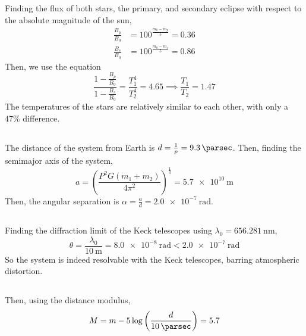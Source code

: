 \documentclass{article}
\begin{document}
\subsection{}

Finding the flux of both stars, the primary, and secondary eclipse with respect to the absolute magnitude of the sun,
\begin{align}
    \frac{B_p}{B_0} &= 100^{\frac{m_0 - m_p}{5}} = \num{0.36} \\
    \frac{B_s}{B_0} &= 100^{\frac{m_0 - m_s}{5}} = \num{0.86}
\end{align}
Then, we use the equation
\begin{equation}
    \frac{1 - \frac{B_p}{B_0}}{1 - \frac{B_s}{B_0}} = \frac{T_1^4}{T_2^4} = \num{4.65} \implies \frac{T_1}{T_2} = \num{1.47}
\end{equation}
The temperatures of the stars are relatively similar to each other, with only a \(47\%\) difference.

\subsection{}

The distance of the system from Earth is \(d = \frac{1}{p} = \SI{9.3}{\parsec}\).
Then, finding the semimajor axis of the system,
\begin{equation}
    a = \left(\frac{P^2 G (m_1 + m_2)}{4 \pi^2}\right)^{\frac{1}{3}} = \SI{5.7e+10}{\meter}
\end{equation}
Then, the angular separation is \(\alpha = \frac{a}{d} = \SI{2.0e-7}{\radian}\).

\subsection{}

Finding the diffraction limit of the Keck telescopes using \(\lambda_0 = \SI{656.281}{\nano\meter}\),
\begin{equation}
    \theta = \frac{\lambda_0}{\SI{10}{\meter}} = \SI{8.0e-8}{\radian} < \SI{2.0e-7}{\radian}
\end{equation}
So the system is indeed resolvable with the Keck telescopes, barring atmospheric distortion.

\subsection{}

Then, using the distance modulus,
\begin{equation}
    M = m - 5 \log\left(\frac{d}{\SI{10}{\parsec}}\right) = \num{5.7}
\end{equation}
\end{document}
